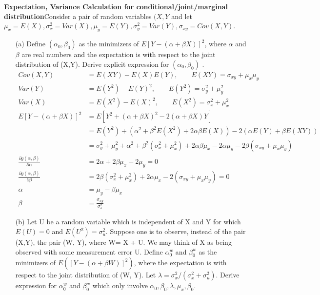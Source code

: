 \section{}
\textbf{Expectation, Variance Calculation for conditional/joint/marginal distribution}Consider a pair of random variables $(X, Y$ and let $\mu_x = E(X), \sigma_x^2= Var(X), \mu_y = E(Y), \sigma_y^2 = Var(Y), \sigma_{xy} = Cov(X,Y)$.
\begin{itemize}
    \item [(a)] Define $(\alpha_0, \beta_0)$ as the minimizers of $E[Y-(\alpha + \beta X)]^2$, where $\alpha$ and $\beta$ are real numbers and the expectation is with respect to the joint distribution of (X,Y). Derive explicit expression for $(\alpha_0, \beta_0)$ .
    \begin{align*}
    Cov(X,Y) &= E(XY) - E(X)E(Y), \qquad E(XY) = \sigma_{xy} + \mu_x\mu_y\\
    Var(Y) &= E(Y^2) - E(Y)^2, \qquad E(Y^2) = \sigma_y^2 + \mu_y^2\\
    Var(X) &= E(X^2) - E(X)^2, \qquad E(X^2) = \sigma_x^2 + \mu_x^2\\
     E[Y-(\alpha + \beta X)]^2 &= E[Y^2 + (\alpha + \beta X)^2 -2(\alpha + \beta X)Y ]\\
     &= E(Y^2) + (\alpha^2 + \beta^2 E(X^2) + 2\alpha\beta E(X)) - 2(\alpha E(Y) + \beta E(XY))\\
     &= \sigma_y^2+\mu_y^2 + \alpha^2 + \beta^2 (\sigma_x^2 + \mu_x^2) + 2\alpha\beta \mu_x -2\alpha \mu_y -2 \beta (\sigma_{xy}+ \mu_x\mu_y)\\
     \frac{\partial g(\alpha,\beta)}{\partial \alpha} &= 2\alpha + 2\beta \mu_x - 2\mu_y = 0\\
     \frac{\partial g(\alpha,\beta)}{\partial \beta} &=2\beta (\sigma_x^2 + \mu_x^2) + 2\alpha \mu_x -2(\sigma_{xy}+\mu_x\mu_y) = 0\\
     \alpha &= \mu_y - \beta \mu_x\\
     \beta &= \frac{\sigma_{xy}}{\sigma_x^2}
    \end{align*}    
    \item[(b)] Let U be a random variable which is independent of X and Y for which $E(U) = 0$ and $E(U^2) = \sigma_u^2$. Suppose one is to observe, instead of the pair (X,Y), the pair (W, Y), where W= X + U. We may think of X as being observed with some measurement error U. Define $\alpha_0^w$ and $\beta_0^w$ as the minimizers of $E([Y- (\alpha + \beta W)]^2)$, where the expectation is with respect to the joint distribution of (W, Y). Let $\lambda = \sigma_x^2/(\sigma_x^2 + \sigma_u^2)$. Derive expression for $\alpha_0^w$ and $\beta_0^w$ which only involve $\alpha_0, \beta_0, \lambda, \mu_x, \beta_0$.

\end{itemize}
